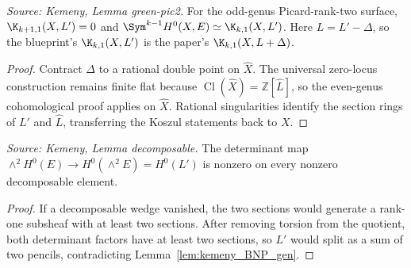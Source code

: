 \begin{lemma}
  \label{lem:kemeny_green_pic2}
  \textit{Source: Kemeny, Lemma green-pic2.}
  For the odd-genus Picard-rank-two surface,
  \(\K_{k+1,1}(X,L')=0\) and
  \(\Sym^{k-1}H^0(X,E)\simeq \K_{k,1}(X,L')\).
  Here \(L=L'-\Delta\), so the blueprint's \(\K_{k,1}(X,L')\) is the paper's
  \(\K_{k,1}(X,L+\Delta)\).
\end{lemma}
\begin{proof}
  Contract \(\Delta\) to a rational double point on \(\hat X\).  The universal
  zero-locus construction remains finite flat because \(\operatorname{Cl}(\hat
  X)=\mathbb Z[\hat L]\), so the even-genus cohomological proof applies on
  \(\hat X\).  Rational singularities identify the section rings of \(L'\) and
  \(\hat L\), transferring the Koszul statements back to \(X\).
\end{proof}

\begin{lemma}
  \label{lem:kemeny_decomposable}
  \textit{Source: Kemeny, Lemma decomposable.}
  The determinant map
  \(\wedge^2H^0(E)\to H^0(\wedge^2E)=H^0(L')\) is nonzero on every nonzero
  decomposable element.
\end{lemma}
\begin{proof}
  If a decomposable wedge vanished, the two sections would generate a rank-one
  subsheaf with at least two sections.  After removing torsion from the quotient,
  both determinant factors have at least two sections, so \(L'\) would split as a
  sum of two pencils, contradicting Lemma~\ref{lem:kemeny_BNP_gen}.
\end{proof}


